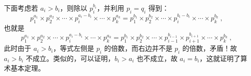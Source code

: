 下面考虑若 $a_i > b_i$，则除以 $p_i^{b_i}$，并利用 $p_i = q_i$ 得到：
\begin{equation}
p_1^{a_1} \times p_2^{a_2} \times \cdots \times p_i^{a_i - b_i} \times \cdots \times p_k^{a_k} = p_1^{b_1} \times p_2^{b_2} \times \cdots \times p_i^{b_i - b_i} \times \cdots \times p_k^{b_k} ~,
\end{equation}
也就是
\begin{equation}
p_1^{a_1} \times p_2^{a_2} \times \cdots \times p_i^{a_i - b_i} \times \cdots \times p_k^{a_k} = p_1^{b_1} \times p_2^{b_2} \times \cdots \times p_{i-1}^{b_{i-1}} \times p_{i+1}^{b_{i+1}} \times \cdots \times p_k^{b_k} ~,
\end{equation}
此时由于 $a_i > b_i$，等式左侧是 $p_i$ 的倍数，而右边并不是 $p_i$ 的倍数，矛盾！故 $a_i > b_i$ 不成立。类似的，可以证明，$b_i > a_i$ 也不成立，故 $a_i = b_i$，这就证明了算术基本定理。
